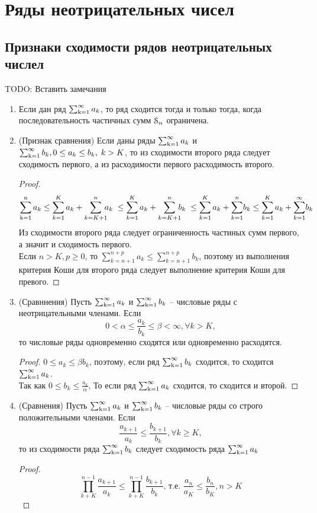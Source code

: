 \chapter{Ряды неотрицательных чисел}
\section*{Признаки сходимости рядов неотрицательных числел}
TODO: Вставить замечания
\begin{enumerate}
\item
Если дан ряд $\operatorname{\sum_{k=1}^{\infty}} a_k$, то ряд сходится тогда и только тогда, когда последовательность частичных сумм $\operatorname{\EuScript{S}}_n$ ограничена.
\item
(Признак сравнения) Если даны  ряды $\operatorname{\sum_{k=1}^{\infty}} a_k $ и $\operatorname{\sum_{k=1}^{\infty}} b_k , 0 \le a_k \le b_k,\; k> K$, то из сходимости второго ряда следует сходимость первого, а из расходимости первого расходимость второго.
\begin{proof}
$$ \ssumn a_k \le \sum_{k=1}^{K} a_k + \sum_{k=K+1}^{n}\!\!\! a_k \; \le \sum_{k=1}^{K} a_k + {\sum_{k=K+1}^{n} \!\!\! b_k}\; \le  \sum_{k=1}^{K}a_k + \sum_{k=1}^n\! b_k \le
\sum_{k=1}^{K}a_k +\sum_{k=1}^{\infty}\! b_k$$
Из сходимости второго ряда следует ограниченность частиных сумм первого, а значит и сходимость первого.\\
Если $n>K, p \ge 0$, то $\sum_{k=n+1}^{n+p}a_k \le \sum_{k=n+1}^{n+p} b_k$, поэтому из выполнения критерия Коши для второго ряда следует выполнение критерия Коши для превого. 
\end{proof}
\item
(Сравннения) Пусть $\operatorname{\sum_{k=1}^{\infty}} a_k $ и $\operatorname{\sum_{k=1}^{\infty}} b_k$ -- числовые ряды с неотрицательными членами. Если $$0 < \alpha \le \frac{a_k}{b_k} \le \beta < \infty, \forall k>K,$$
то числовые ряды одновременно сходятся или одновременно расходятся.
\begin{proof}
$0 \le a_k \le \beta b_k$, поэтому, если ряд $\operatorname{\sum_{k=1}^{\infty}} b_k$ сходится, то сходится $\operatorname{\sum_{k=1}^{\infty}} a_k$.\\
Так как $0 \le b_k \le \frac{a_k}{\alpha}$,
То если ряд $\operatorname{\sum_{k=1}^{\infty}} a_k$ сходится, то сходится и второй.
\end{proof}
\item
(Сравнения) Пусть $\operatorname{\sum_{k=1}^{\infty}} a_k $ и $\operatorname{\sum_{k=1}^{\infty}} b_k$ -- числовые ряды со строго положительными членами. Если
$$ \frac{a_{k+1}}{a_k}\le \frac{b_{k+1}}{b_k}, \forall k \ge K,$$
то из сходимости ряда $\operatorname{\sum_{k=1}^{\infty}} b_k$ следует сходимость ряда $\operatorname{\sum_{k=1}^{\infty}} a_k$
\begin{proof}
$$ \prod_{k+K}^{n-1}\frac{a_{k+1}}{a_k} \le \prod_{k+K}^{n-1}\frac{b_{k+1}}{b_k}\text{, т.е. } \frac{a_{n}}{a_K} \le \frac{b_{n}}{b_K}, n>K$$

\end{proof}
\end{enumerate}
